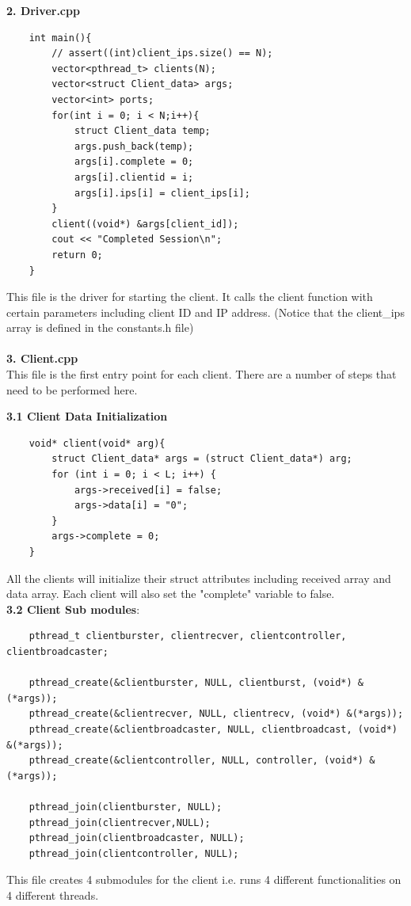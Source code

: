 \documentclass[12pt]{scrartcl}
\begin{document}
\textbf{2. Driver.cpp}\\
\begin{verbatim}
    int main(){
        // assert((int)client_ips.size() == N);
        vector<pthread_t> clients(N);
        vector<struct Client_data> args;
        vector<int> ports;
        for(int i = 0; i < N;i++){
            struct Client_data temp;
            args.push_back(temp);
            args[i].complete = 0;
            args[i].clientid = i;
            args[i].ips[i] = client_ips[i];
        }
        client((void*) &args[client_id]);
        cout << "Completed Session\n";
        return 0;
    }
\end{verbatim}
This file is the driver for starting the client. It calls the client function with certain parameters including client ID and IP address. (Notice that the client\_ips array is defined in the constants.h file)\\
\\
\textbf{3. Client.cpp}\\

This file is the first entry point for each client. There are a number of steps that need to be performed here.

\textbf{3.1 Client Data Initialization}
\begin{verbatim}
    void* client(void* arg){
        struct Client_data* args = (struct Client_data*) arg;
        for (int i = 0; i < L; i++) {
            args->received[i] = false;
            args->data[i] = "0";
        }
        args->complete = 0;
    }
\end{verbatim}
All the clients will initialize their struct attributes including received array and data array. Each client will also set the "complete" variable to false.\\

\textbf{3.2 Client Sub modules}:
\begin{verbatim}
    pthread_t clientburster, clientrecver, clientcontroller, clientbroadcaster;
    
    pthread_create(&clientburster, NULL, clientburst, (void*) &(*args));
    pthread_create(&clientrecver, NULL, clientrecv, (void*) &(*args));
    pthread_create(&clientbroadcaster, NULL, clientbroadcast, (void*) &(*args));
    pthread_create(&clientcontroller, NULL, controller, (void*) &(*args));

    pthread_join(clientburster, NULL);
    pthread_join(clientrecver,NULL);
    pthread_join(clientbroadcaster, NULL);
    pthread_join(clientcontroller, NULL);
\end{verbatim}
This file creates 4 submodules for the client i.e. runs 4 different functionalities on 4 different threads. \\
\end{document}
